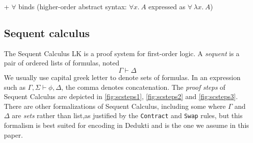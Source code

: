 \documentclass{article}
\begin{document}
	+ $\forall$ binds (higher-order abstract syntax: $\forall x.~A$ expressed as $\forall~\lambda x.~A$)
	
	\iffalse
	We consider first order logic with arbitrary constant function and predicate symbols. Fomally We fix:
	\begin{itemize}
		\item a set of constant symbols $C$ noted $f^j, g^j, h^j, f^j_i,...$ for indices $i\in \mathbb{N}$ and where the superscript $j$ denotes the \textit{arity} of the symbol
		\item a countably infinite set of schematic function symbols $'C$ noted $ 'f^j, 'g^j, 'h^j, f^j_i,...$ for indices $i\in \mathbb{N}$ and where the superscript $j$ denotes the \textit{arity} of the symbol.
	\end{itemize}
	We also call schematic functions symbols of arity 0 \textit{variables}, and note them $x,y,z$.
	The set of terms of height at most $n$ is
	$$\mathcal{T}_0 := \lbrace f^0 \mid f^0 \in C\rbrace \cup \lbrace 'f^0 \mid 'f^0 \in C \rbrace$$
	$$\mathcal{T}_{n+1} := \mathcal{T}_n \cup \lbrace f^j(\vec{t}) \mid f^j\in \mathcal{C}, \vec{t}\in \mathcal{T}_n^j, j>0 \rbrace \cup \lbrace 'f^j(\vec{t}) \mid 'f^j\in \mathcal{C}, \vec{t}\in \mathcal{T}_n^j, j>0 \rbrace$$
	and the set of all termsis $\mathcal T = \bigcup_{n=0}^\infty \mathcal{T}_n$.  Moreover, we allow \textit{schematic functions, predicate and connector symbols}.
	
	\fi
	\subsection{Sequent calculus}
	The Sequent Calculus LK is a proof system for first-order logic. A \textit{sequent} is a pair of ordered lists of formulas, noted
	$$
	\Gamma \vdash \Delta
	$$
	We usually use capital greek letter to denote sets of formulas. In an expression such as $\Gamma, \Sigma \vdash \phi, \Delta$, the comma denotes concatenation.
	The \textit{proof steps} of Sequent Calculus are depicted in \autoref{fig:scsteps1}, \autoref{fig:scsteps2} and \autoref{fig:scsteps3}. There are other formalizations of Sequent Calculus, including some where $\Gamma$ and $\Delta$ are \textit{sets} rather than list,as justified by the \texttt{Contract} and \texttt{Swap} rules, but this formalism is best suited for encoding in Dedukti and is the one we assume in this paper.
	
\end{document}
